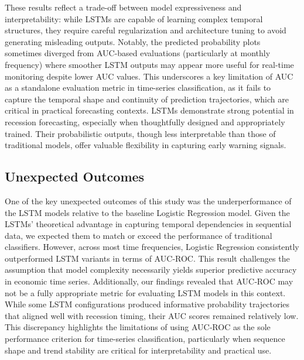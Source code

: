 These results reflect a trade-off between model expressiveness and interpretability: while LSTMs are capable of learning complex temporal structures, they require careful regularization and architecture tuning to avoid generating misleading outputs. Notably, the predicted probability plots sometimes diverged from AUC-based evaluations (particularly at monthly frequency) where smoother LSTM outputs may appear more useful for real-time monitoring despite lower AUC values. This underscores a key limitation of AUC as a standalone evaluation metric in time-series classification, as it fails to capture the temporal shape and continuity of prediction trajectories, which are critical in practical forecasting contexts. 
LSTMs demonstrate strong potential in recession forecasting, especially when thoughtfully designed and appropriately trained. Their probabilistic outputs, though less interpretable than those of traditional models, offer valuable flexibility in capturing early warning signals.




\subsection{Unexpected Outcomes}

One of the key unexpected outcomes of this study was the underperformance of the LSTM models relative to the baseline Logistic Regression model. Given the LSTMs’ theoretical advantage in capturing temporal dependencies in sequential data, we expected them to match or exceed the performance of traditional classifiers. However, across most time frequencies, Logistic Regression consistently outperformed LSTM variants in terms of AUC‐ROC. This result challenges the assumption that model complexity necessarily yields superior predictive accuracy in economic time series. Additionally, our findings revealed that AUC‐ROC may not be a fully appropriate metric for evaluating LSTM models in this context. While some LSTM configurations produced informative probability trajectories that aligned well with recession timing, their AUC scores remained relatively low. This discrepancy highlights the limitations of using AUC‐ROC as the sole performance criterion for time-series classification, particularly when sequence shape and trend stability are critical for interpretability and practical use.



